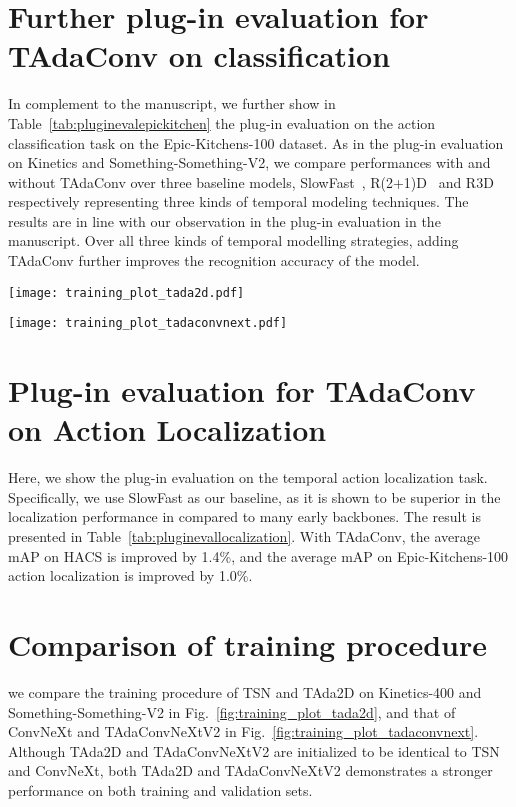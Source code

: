 \documentclass[10pt,journal,compsoc]{IEEEtran}
\begin{document}
\section{Further plug-in evaluation for TAdaConv on classification}
\label{appendix:pluginclassification}

In complement to the manuscript, we further show in Table~\ref{tab:pluginevalepickitchen} the plug-in evaluation on the action classification task on the Epic-Kitchens-100 dataset.
As in the plug-in evaluation on Kinetics and Something-Something-V2, we compare performances with and without TAdaConv over three baseline models, SlowFast~\cite{slowfast}, R(2+1)D~\cite{r21d} and R3D~\cite{retrace} respectively representing three kinds of temporal modeling techniques. 
The results are in line with our observation in the plug-in evaluation in the manuscript. Over all three kinds of temporal modelling strategies, adding TAdaConv further improves the recognition accuracy of the model.
\begin{figure*}[t]
\centering
\texttt{[image: training\_plot\_tada2d.pdf]}
\caption{\textbf{Training and validation on Kinetics-400 and Something-Something-V2 for TAda2D.} On both datasets, TAda2D shows a stronger capability of fitting the data and a better generality to the validation set. Further, TAda2D reduces the overfitting problem in Something-Something-V2.}
\label{fig:training_plot_tada2d}
\end{figure*}
\begin{figure*}[t]
\centering
\texttt{[image: training\_plot\_tadaconvnext.pdf]}
\caption{\textbf{Training and validation on Kinetics-400 and Something-Something-V2 for TAdaConvNeXt.}}
\label{fig:training_plot_tadaconvnext}
\end{figure*}
\section{Plug-in evaluation for TAdaConv on Action Localization}
\label{appendix:pluginlocalization}
Here, we show the plug-in evaluation on the temporal action localization task. 
Specifically, we use SlowFast as our baseline, as it is shown to be superior in the localization performance in \cite{tcanet} compared to many early backbones.
The result is presented in Table~\ref{tab:pluginevallocalization}. 
With TAdaConv, the average mAP on HACS is improved by 1.4\%, and the average mAP on Epic-Kitchens-100 action localization is improved by 1.0\%. 

\section{Comparison of training procedure}
\label{appendix:trainingprocedure}
we compare the training procedure of TSN and TAda2D on Kinetics-400 and Something-Something-V2 in Fig.~\ref{fig:training_plot_tada2d}, and that of ConvNeXt and TAdaConvNeXtV2 in Fig.~\ref{fig:training_plot_tadaconvnext}. Although TAda2D and TAdaConvNeXtV2 are initialized to be identical to TSN and ConvNeXt, both TAda2D and TAdaConvNeXtV2 demonstrates a stronger performance on both training and validation sets. 
\end{document}
